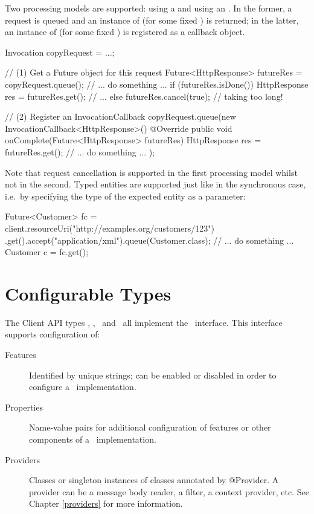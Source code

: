 Two processing models are supported: using a  and using an . In the former, a request is queued and an instance of  (for some fixed ) is returned; in the latter, an instance of  (for some fixed ) is registered as a callback object.

\begin{listing}{1}
Invocation copyRequest = ...;

// (1) Get a Future object for this request
Future<HttpResponse> futureRes = copyRequest.queue();
// ... do something ...
if (futureRes.isDone()) {
    HttpResponse res = futureRes.get();
    // ...
} else {
    futureRes.cancel(true);        // taking too long!
}

// (2) Register an InvocationCallback
copyRequest.queue(new InvocationCallback<HttpResponse>() {
    @Override
    public void onComplete(Future<HttpResponse> futureRes) { 
        HttpResponse res = futureRes.get();
        // ... do something ... 
    }
});
\end{listing}

Note that request cancellation is supported in the first processing model whilst not in the second. Typed entities are supported just like in the synchronous case, i.e.~by specifying the type of the expected entity as a parameter:

\begin{listing}{1}
Future<Customer> fc = client.resourceUri("http://examples.org/customers/123")
    .get().accept("application/xml").queue(Customer.class);
// ... do something ...
Customer c = fc.get();
\end{listing}

\section{Configurable Types}
\label{configurable_types}

The Client API types \Client, \ClientConfiguration, \ResourceUri\ and \Invocation\ all implement the \Configurable\ interface. This interface supports configuration of:

\begin{description}
\item [Features] Identified by unique strings; can be enabled or disabled in order to configure a \jaxrs\ implementation.
\item [Properties] Name-value pairs for additional configuration of features or other components of a \jaxrs\ implementation.
\item [Providers] Classes or singleton instances of classes annotated by @Provider. A provider can be a message body reader, a filter, a context provider, etc. See Chapter \ref{providers} for more information.
\end{description}

